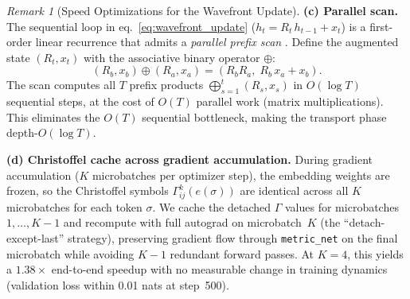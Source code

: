 \documentclass[11pt,a4paper]{article}
\theoremstyle{definition}
\theoremstyle{remark}
\newtheorem{remark}[theorem]{Remark}
\begin{document}
\begin{remark}[Speed Optimizations for the Wavefront Update]
\textbf{(c) Parallel scan.}
The sequential loop in eq.~\eqref{eq:wavefront_update}
($h_t = R_t\, h_{t-1} + x_t$) is a first-order linear
recurrence that admits a \emph{parallel prefix scan}
\cite{blelloch1990}.  Define the augmented state
$(R_t, x_t)$ with the associative binary operator
$\oplus$:
\[
  (R_b, x_b) \oplus (R_a, x_a) = (R_b R_a,\; R_b\, x_a + x_b).
\]
The scan computes all $T$ prefix products
$\bigoplus_{s=1}^{t} (R_s, x_s)$ in $O(\log T)$ sequential
steps, at the cost of $O(T)$ parallel work (matrix
multiplications).  This eliminates the $O(T)$ sequential
bottleneck, making the transport phase depth-$O(\log T)$.

\textbf{(d) Christoffel cache across gradient accumulation.}
During gradient accumulation ($K$ microbatches per optimizer
step), the embedding weights are frozen, so the Christoffel
symbols $\Gamma^k_{ij}(e(\sigma))$ are identical across all
$K$ microbatches for each token $\sigma$.  We cache the
detached $\Gamma$ values for microbatches $1, \ldots, K-1$
and recompute with full autograd on microbatch~$K$ (the
``detach-except-last'' strategy), preserving gradient flow
through \texttt{metric\_net} on the final microbatch while
avoiding $K-1$ redundant forward passes.  At $K = 4$, this
yields a $1.38\times$ end-to-end speedup with no measurable
change in training dynamics (validation loss within 0.01
nats at step~500).
\end{remark}
\end{document}
